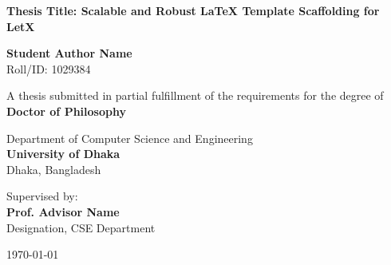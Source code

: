 \begin{titlepage}
\begin{center}
    \vspace*{1cm}
    
    
    \vspace{1.5cm}
    
    {\huge \bfseries \color{primary} Thesis Title: Scalable and Robust LaTeX Template Scaffolding for LetX}
    
    \vspace{1.5cm}
    
    {\Large \bfseries Student Author Name} \\
    \vspace{0.2cm}
    {Roll/ID: 1029384}
    
    \vspace{1.5cm}
    
    {A thesis submitted in partial fulfillment of the requirements for the degree of} \\
    \vspace{0.3cm}
    {\large \bfseries \color{secondary} Doctor of Philosophy}
    
    \vspace{1.5cm}
    
    {Department of Computer Science and Engineering} \\
    \vspace{0.2cm}
    {\large \bfseries \color{primary} University of Dhaka} \\
    \vspace{0.1cm}
    {Dhaka, Bangladesh}
    
    \vfill
    
    {Supervised by:} \\
    {\large \bfseries Prof. Advisor Name} \\
    {Designation, CSE Department}
    
    \vspace{1cm}
    
    {\large \today}
    
\end{center}
\end{titlepage}
